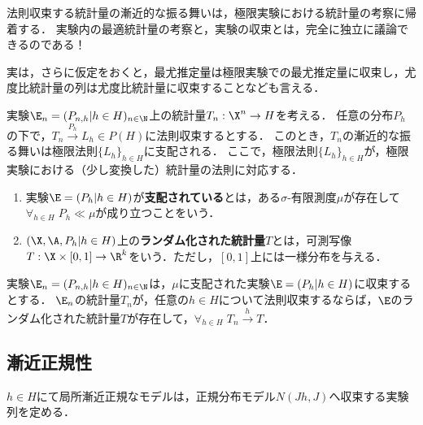 \documentclass[uplatex,dvipdfmx]{jsreport}
\begin{document}
\begin{tcolorbox}[colframe=ForestGreen, colback=ForestGreen!10!white,breakable,colbacktitle=ForestGreen!40!white,coltitle=black,fonttitle=\bfseries\sffamily,
title=]
    法則収束する統計量の漸近的な振る舞いは，極限実験における統計量の考察に帰着する．
    実験内の最適統計量の考察と，実験の収束とは，完全に独立に議論できるのである！

    実は，さらに仮定をおくと，最尤推定量は極限実験での最尤推定量に収束し，尤度比統計量の列は尤度比統計量に収束することなども言える．
\end{tcolorbox}

\begin{notation}
    実験$\E_n=(P_{n,h}|h\in H)_{n\in\N}$上の統計量$T_n:\X^n\to H$を考える．
    任意の分布$P_h$の下で，$T_n\xrightarrow{P_h} L_h\in P(H)$に法則収束するとする．
    このとき，$T_n$の漸近的な振る舞いは極限法則$\{L_h\}_{h\in H}$に支配される．
    ここで，極限法則$\{L_h\}_{h\in H}$が，極限実験における（少し変換した）統計量の法則に対応する．
\end{notation}

\begin{definition}\mbox{}
    \begin{enumerate}
        \item 実験$\E=(P_h|h\in H)$が\textbf{支配されている}とは，ある$\sigma$-有限測度$\mu$が存在して$\forall_{h\in H}\;P_h\ll\mu$が成り立つことをいう．
        \item $(\X,\A,P_h|h\in H)$上の\textbf{ランダム化された統計量}$T$とは，可測写像$T:\X\times[0,1]\to\R^k$をいう．ただし，$[0,1]$上には一様分布を与える．
    \end{enumerate}
\end{definition}

\begin{theorem}[法則収束統計量の漸近表現定理]
    実験$\E_n=(P_{n,h}|h\in H)_{n\in\N}$は，$\mu$に支配された実験$\E=(P_h|h\in H)$に収束するとする．
    $\E_n$の統計量$T_n$が，任意の$h\in H$について法則収束するならば，$\E$のランダム化された統計量$T$が存在して，$\forall_{h\in H}\;T_n\xrightarrow{h}T$．
\end{theorem}

\subsection{漸近正規性}

\begin{tcolorbox}[colframe=ForestGreen, colback=ForestGreen!10!white,breakable,colbacktitle=ForestGreen!40!white,coltitle=black,fonttitle=\bfseries\sffamily,
title=]
    $h\in H$にて局所漸近正規なモデルは，正規分布モデル$N(Jh,J)$へ収束する実験列を定める．
\end{tcolorbox}
\end{document}
